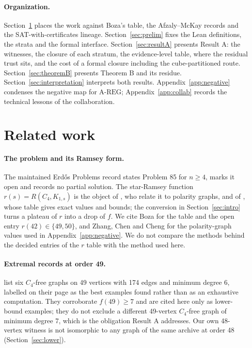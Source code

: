 \documentclass{anvil-paper}
\newcommand{\AREG}{\mathrm{A\text{-}REG}}
\theoremstyle{definition}
\begin{document}
\paragraph{Organization.} Section~\ref{sec:related} places the work against Boza's table, the Afzaly--McKay records and the SAT-with-certificates lineage. Section~\ref{sec:prelim} fixes the Lean definitions, the strata and the formal interface. Section~\ref{sec:resultA} presents Result A: the witnesses, the closure of each stratum, the evidence-level table, where the residual trust sits, and the cost of a formal closure including the cube-partitioned route. Section~\ref{sec:theoremB} presents Theorem B and its residue. Section~\ref{sec:interpretation} interprets both results. Appendix~\ref{app:negative} condenses the negative map for $\AREG$; Appendix~\ref{app:collab} records the technical lessons of the collaboration.

\section{Related work}\label{sec:related}

\paragraph{The problem and its Ramsey form.} The maintained Erdős Problems record \citep{bloom-erdos85} states Problem 85 for $n\ge 4$, marks it open and records no partial solution. The star-Ramsey function $r(s)=R(C_4,K_{1,s})$ is the object of \citet{zhang2017polarity}, who relate it to polarity graphs, and of \citet{boza2024ramsey}, whose table gives exact values and bounds; the conversion in Section~\ref{sec:intro} turns a plateau of $r$ into a drop of $f$. We cite Boza for the table and the open entry $r(42)\in\{49,50\}$, and Zhang, Chen and Cheng for the polarity-graph values used in Appendix~\ref{app:negative}. We do not compare the methods behind the decided entries of the $r$ table with the method used here.

\paragraph{Extremal records at order 49.} \citet{afzaly-mckay-extremal} list six $C_4$-free graphs on 49 vertices with 174 edges and minimum degree 6, labelled on their page as the best examples found rather than as an exhaustive computation. They corroborate $f(49)\ge 7$ and are cited here only as lower-bound examples; they do not exclude a different 49-vertex $C_4$-free graph of minimum degree 7, which is the obligation Result A addresses. Our own 48-vertex witness is not isomorphic to any graph of the same archive at order 48 (Section~\ref{sec:lower}).
\end{document}
